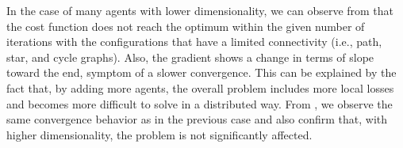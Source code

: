 \documentclass[a4paper,11pt,oneside]{book}
\begin{document}
In the case of many agents with lower dimensionality, we can observe from  that the cost function does not reach the optimum within the given number of iterations with the configurations that have a limited connectivity (i.e., path, star, and cycle graphs). Also, the gradient shows a change in terms of slope toward the end, symptom of a slower convergence. This can be explained by the fact that, by adding more agents, the overall problem includes more local losses and becomes more difficult to solve in a distributed way. From , we observe the same convergence behavior as in the previous case and also confirm that, with higher dimensionality, the problem is not significantly affected.



\end{document}
